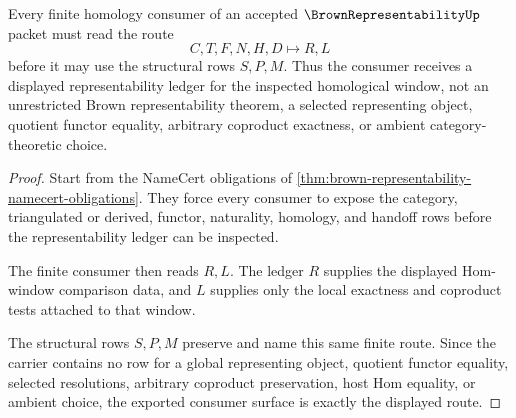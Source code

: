 \begin{theorem}
\label{thm:brown-representability-finite-homology-consumer}
Every finite homology consumer of an accepted $\BrownRepresentabilityUp$ packet must read the route
$$
C,T,F,N,H,D \longmapsto R,L
$$
before it may use the structural rows $S,P,M$. Thus the consumer receives a displayed representability ledger for the inspected homological window, not an unrestricted Brown representability theorem, a selected representing object, quotient functor equality, arbitrary coproduct exactness, or ambient category-theoretic choice.
\end{theorem}
\begin{proof}
Start from the NameCert obligations of \autoref{thm:brown-representability-namecert-obligations}. They force every consumer to expose the category, triangulated or derived, functor, naturality, homology, and handoff rows before the representability ledger can be inspected.

The finite consumer then reads $R,L$. The ledger $R$ supplies the displayed Hom-window comparison data, and $L$ supplies only the local exactness and coproduct tests attached to that window.

The structural rows $S,P,M$ preserve and name this same finite route. Since the carrier contains no row for a global representing object, quotient functor equality, selected resolutions, arbitrary coproduct preservation, host Hom equality, or ambient choice, the exported consumer surface is exactly the displayed route.
\end{proof}


\begin{closurestatus}{\BrownRepresentabilityUp}
  \theoryclosure{\seedClosure}
  \formalstatus{\unformalizedV}
\end{closurestatus}
